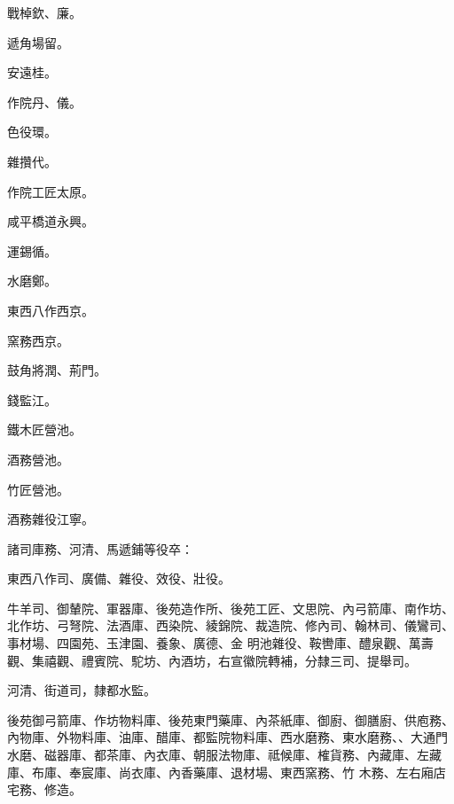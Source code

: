 \begin{pinyinscope}
 戰棹欽、廉。



 遞角場留。



 安遠桂。



 作院丹、儀。



 色役環。



 雜攢代。



 作院工匠太原。



 咸平橋道永興。



 運錫循。



 水磨鄭。



 東西八作西京。



 窯務西京。



 鼓角將潤、荊門。



 錢監江。



 鐵木匠營池。



 酒務營池。



 竹匠營池。



 酒務雜役江寧。



 諸司庫務、河清、馬遞鋪等役卒：



 東西八作司、廣備、雜役、效役、壯役。



 牛羊司、御輦院、軍器庫、後苑造作所、後苑工匠、文思院、內弓箭庫、南作坊、北作坊、弓弩院、法酒庫、西染院、綾錦院、裁造院、修內司、翰林司、儀鸞司、事材場、四園苑、玉津園、養象、廣德、金
 明池雜役、鞍轡庫、醴泉觀、萬壽觀、集禧觀、禮賓院、駝坊、內酒坊，右宣徽院轉補，分隸三司、提舉司。



 河清、街道司，隸都水監。



 後苑御弓箭庫、作坊物料庫、後苑東門藥庫、內茶紙庫、御廚、御膳廚、供庖務、內物庫、外物料庫、油庫、醋庫、都監院物料庫、西水磨務、東水磨務、、大通門水磨、磁器庫、都茶庫、內衣庫、朝服法物庫、祗候庫、榷貨務、內藏庫、左藏庫、布庫、奉宸庫、尚衣庫、內香藥庫、退材場、東西窯務、竹
 木務、左右廂店宅務、修造。




\end{pinyinscope}

